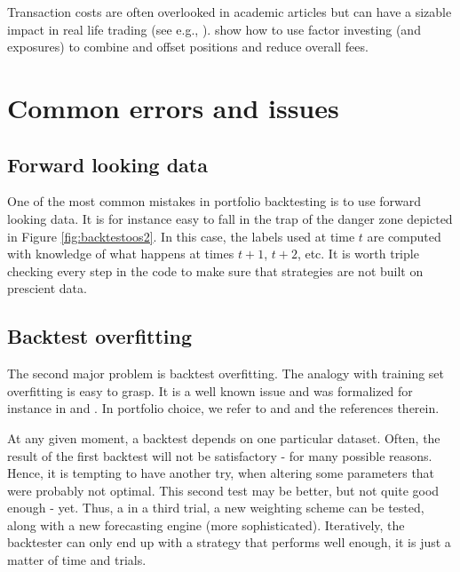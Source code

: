 \documentclass[]{krantz}
\theoremstyle{definition}
\theoremstyle{definition}
\theoremstyle{definition}
\theoremstyle{remark}
\begin{document}
Transaction costs are often overlooked in academic articles but can have
a sizable impact in real life trading (see e.g.,
\citet{novy2015taxonomy}). \citet{martin2018transaction} show how to use
factor investing (and exposures) to combine and offset positions and
reduce overall fees.

\hypertarget{common-errors-and-issues}{%
\section{Common errors and issues}\label{common-errors-and-issues}}

\hypertarget{forward-looking-data}{%
\subsection{Forward looking data}\label{forward-looking-data}}

One of the most common mistakes in portfolio backtesting is to use
forward looking data. It is for instance easy to fall in the trap of the
danger zone depicted in Figure \ref{fig:backtestoos2}. In this case, the
labels used at time \(t\) are computed with knowledge of what happens at
times \(t+1\), \(t+2\), etc. It is worth triple checking every step in
the code to make sure that strategies are not built on prescient data.

\hypertarget{backtest-overfitting}{%
\subsection{Backtest overfitting}\label{backtest-overfitting}}

The second major problem is backtest overfitting. The analogy with
training set overfitting is easy to grasp. It is a well known issue and
was formalized for instance in \citet{white2000reality} and
\citet{romano2005stepwise}. In portfolio choice, we refer to
\citet{bajgrowicz2012technical} and \citet{bailey2014deflated} and the
references therein.

At any given moment, a backtest depends on one particular dataset.
Often, the result of the first backtest will not be satisfactory - for
many possible reasons. Hence, it is tempting to have another try, when
altering some parameters that were probably not optimal. This second
test may be better, but not quite good enough - yet. Thus, a in a third
trial, a new weighting scheme can be tested, along with a new
forecasting engine (more sophisticated). Iteratively, the backtester can
only end up with a strategy that performs well enough, it is just a
matter of time and trials.
\end{document}

